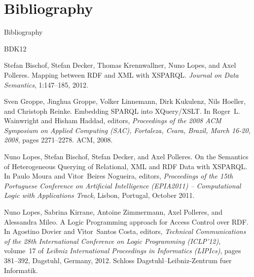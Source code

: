 \documentclass[table,svgnames]{beamer}
\begin{document}




\setcounter{finalframe}{\value{framenumber}}

\appendix

\section*{Bibliography}
{
  \addtocounter{framenumber}{-1}
  \begin{frame}[allowframebreaks]{Bibliography}
    \def\newblock{}
\begin{thebibliography}{BDK{\etalchar{+}}12}

Stefan Bischof, Stefan Decker, Thomas Krennwallner, Nuno Lopes, and Axel
  Polleres.
\newblock {Mapping between RDF and XML with XSPARQL}.
\newblock {\em Journal on Data Semantics}, 1:147--185, 2012.

Sven Groppe, Jinghua Groppe, Volker Linnemann, Dirk Kukulenz, Nils Hoeller, and
  Christoph Reinke.
\newblock {Embedding SPARQL into XQuery/XSLT}.
\newblock In Roger~L. Wainwright and Hisham Haddad, editors, {\em {Proceedings
  of the 2008 ACM Symposium on Applied Computing (SAC), Fortaleza, Ceara,
  Brazil, March 16-20, 2008}}, pages 2271--2278. ACM, 2008.

Nuno Lopes, Stefan Bischof, Stefan Decker, and Axel Polleres.
\newblock {On the Semantics of Heterogeneous Querying of Relational, XML and
  RDF Data with XSPARQL}.
\newblock In Paulo Moura and Vitor~Beires Nogueira, editors, {\em {Proceedings
  of the 15th Portuguese Conference on Artificial Intelligence (EPIA2011) --
  Computational Logic with Applications Track}}, Lisbon, Portugal, October
  2011.

Nuno Lopes, Sabrina Kirrane, Antoine Zimmermann, Axel Polleres, and Alessandra
  Mileo.
\newblock {A Logic Programming approach for Access Control over RDF}.
\newblock In Agostino Dovier and V{\'\i}tor~Santos Costa, editors, {\em
  {Technical Communications of the 28th International Conference on Logic
  Programming (ICLP'12)}}, volume~17 of {\em Leibniz International Proceedings
  in Informatics (LIPIcs)}, pages 381--392, Dagstuhl, Germany, 2012. Schloss
  Dagstuhl--Leibniz-Zentrum fuer Informatik.


\end{thebibliography}
\end{frame}}
\end{document}

